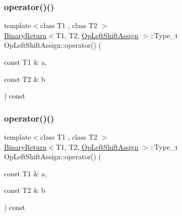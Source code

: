 \subsubsection{\texorpdfstring{operator()()}{operator()()}\hspace{0.1cm}{\footnotesize\ttfamily [1/3]}}
{\footnotesize\ttfamily template$<$class T1 , class T2 $>$ \\
\mbox{\hyperlink{structBinaryReturn}{Binary\+Return}}$<$T1, T2, \mbox{\hyperlink{structOpLeftShiftAssign}{Op\+Left\+Shift\+Assign}} $>$\+::Type\+\_\+t Op\+Left\+Shift\+Assign\+::operator() (\begin{DoxyParamCaption}\item[{const T1 \&}]{a,  }\item[{const T2 \&}]{b }\end{DoxyParamCaption}) const\hspace{0.3cm}{\ttfamily [inline]}}

\mbox{\label{structOpLeftShiftAssign_a1606d84ca8d3445b33cbf098a7c3667e}} 
\subsubsection{\texorpdfstring{operator()()}{operator()()}\hspace{0.1cm}{\footnotesize\ttfamily [2/3]}}
{\footnotesize\ttfamily template$<$class T1 , class T2 $>$ \\
\mbox{\hyperlink{structBinaryReturn}{Binary\+Return}}$<$T1, T2, \mbox{\hyperlink{structOpLeftShiftAssign}{Op\+Left\+Shift\+Assign}} $>$\+::Type\+\_\+t Op\+Left\+Shift\+Assign\+::operator() (\begin{DoxyParamCaption}\item[{const T1 \&}]{a,  }\item[{const T2 \&}]{b }\end{DoxyParamCaption}) const\hspace{0.3cm}{\ttfamily [inline]}}

\mbox{\label{structOpLeftShiftAssign_a1606d84ca8d3445b33cbf098a7c3667e}} 
